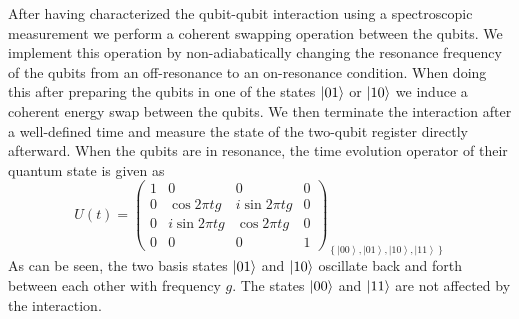 After having characterized the qubit-qubit interaction using a spectroscopic measurement we perform a coherent swapping operation between the qubits. We implement this operation by non-adiabatically changing the resonance frequency of the qubits from an off-resonance to an on-resonance condition. When doing this after preparing the qubits in one of the states $\left| 01 \right>$ or $\left| 10 \right>$ we induce a coherent energy swap between the qubits. We then terminate the interaction after a well-defined time and measure the state of the two-qubit register directly afterward. When the qubits are in resonance, the time evolution operator of their quantum state is given as
%
\begin{equation}
U(t)=\left(\begin{array}{cccc}
1 & 0 & 0 & 0\\
0 & \cos{2\pi tg} & i\sin{2\pi tg} & 0\\
0 & i\sin{2\pi tg} & \cos{2\pi tg} & 0\\
0 & 0 & 0 & 1\end{array}\right)_{\left\{ \left|00\right\rangle ,\left|01\right\rangle ,\left|10\right\rangle ,\left|11\right\rangle \right\} } \label{eq:swap_evolution_operator_main}
\end{equation}
%
As can be seen, the two basis states $\left| 01 \right>$ and $\left| 10 \right>$ oscillate back and forth between each other with frequency $g$. The states $\left| 00 \right>$ and $\left| 11 \right>$ are not affected by the interaction.

\smallskip

